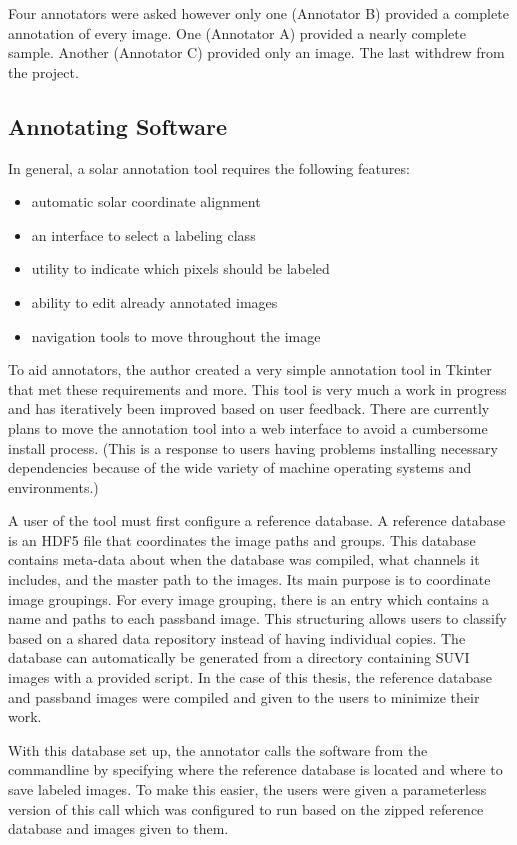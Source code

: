 \documentclass[twoside]{report}
\begin{document}
Four annotators were asked however only one (Annotator B) provided a complete annotation of every image. One (Annotator A) provided a nearly complete sample. Another (Annotator C) provided only an image. The last withdrew from the project. 

\subsection{Annotating Software}
In general, a solar annotation tool requires the following features:
\begin{itemize}
\item automatic solar coordinate alignment 
\item an interface to select a labeling class
\item utility to indicate which pixels should be labeled
\item ability to edit already annotated images
\item navigation tools to move throughout the image
\end{itemize}

To aid annotators, the author created a very simple annotation tool in Tkinter that met these requirements and more. This tool is very much a work in progress and has iteratively been improved based on user feedback. There are currently plans to move the annotation tool into a web interface to avoid a cumbersome install process. (This is a response to users having problems installing necessary dependencies because of the wide variety of machine operating systems and environments.) 

A user of the tool must first configure a reference database. A reference database is an HDF5 file that coordinates the image paths and groups. This database contains meta-data about when the database was compiled, what channels it includes, and the master path to the images. Its main purpose is to coordinate image groupings. For every image grouping, there is an entry which contains a name and paths to each passband image. This structuring allows users to classify based on a shared data repository instead of having individual copies. The database can automatically be generated from a directory containing SUVI images with a provided script. In the case of this thesis, the reference database and passband images were compiled and given to the users to minimize their work. 

With this database set up, the annotator calls the software from the commandline by specifying where the reference database is located and where to save labeled images. To make this easier, the users were given a parameterless version of this call which was configured to run based on the zipped reference database and images given to them. 
\end{document}
